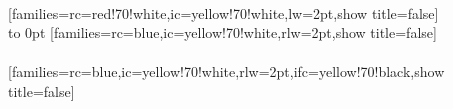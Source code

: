\\ [5pt][families={rc=red!70!white,ic=yellow!70!white,lw=2pt},show title=false]%
\\ [5pt]\vbox to 0pt{\makebox[\linewidth][c]{\scalebox{.6}{\pgfPT[families={rc=red!70!white,ic=yellow!70!white,lw=2pt},show title=false]}}}%
\newpage%
[families={rc=blue,ic=yellow!70!white,rlw=2pt},show title=false]%
\\ [5pt]\makebox[\linewidth][c]{\scalebox{.6}{\pgfPT[families={rc=blue,ic=yellow!70!white,rlw=2pt},show title=false]}}%
\\ [10pt][families={rc=blue,ic=yellow!70!white,rlw=2pt,ifc=yellow!70!black},show title=false]%
\\ [5pt]\makebox[\linewidth][c]{\scalebox{.6}{\pgfPT[families={rc=blue,ic=yellow!70!white,rlw=2pt,ifc=yellow!70!black},show title=false]}}%
\\ [0pt]\pgfPTendstyle%
\endinput
